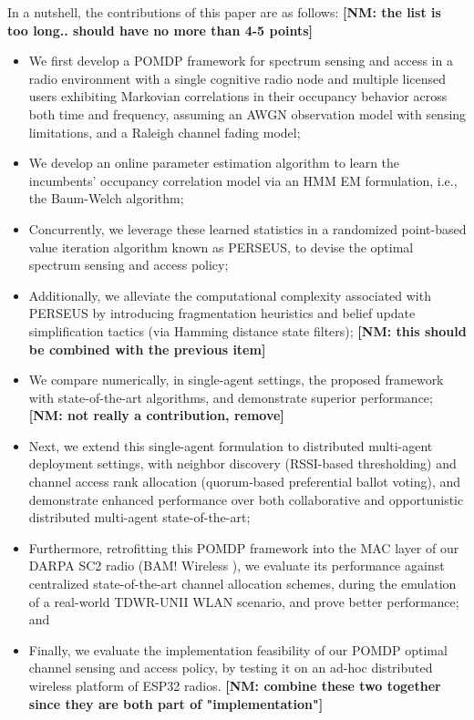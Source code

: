 \documentclass[12pt, draftcls, onecolumn]{IEEEtran}
\newcommand{\nm}[1]{{\color{blue}\bf{[NM: #1]}}}
\begin{document}
 In a nutshell, the contributions of this paper are as follows:
\nm{the list is too long.. should have no more than 4-5 points}
\begin{itemize}
    \item We first develop a POMDP framework for spectrum sensing and access in a radio environment with a single cognitive radio node and multiple licensed users exhibiting Markovian correlations in their occupancy behavior across both time and frequency, assuming an AWGN observation model with sensing limitations, and a Raleigh channel fading model;
    \item We develop an online parameter estimation algorithm to learn the incumbents' occupancy correlation model via an HMM EM formulation, i.e., the Baum-Welch algorithm;
    \item Concurrently, we leverage these learned statistics in a randomized point-based value iteration algorithm known as PERSEUS, to devise the optimal spectrum sensing and access policy;
    \item Additionally, we alleviate the computational complexity associated with PERSEUS by introducing fragmentation heuristics and belief update simplification tactics (via Hamming distance state filters);
    \nm{this should be combined with the previous item}
    \item We compare numerically, in single-agent settings, the proposed framework with state-of-the-art algorithms, and demonstrate superior performance;
    \nm{not really a contribution, remove}
    \item Next, we extend this single-agent formulation to distributed multi-agent deployment settings, with neighbor discovery (RSSI-based thresholding) and channel access rank allocation (quorum-based preferential ballot voting), and demonstrate enhanced performance over both collaborative and opportunistic distributed multi-agent state-of-the-art;
    \item Furthermore, retrofitting this POMDP framework into the MAC layer of our DARPA SC2 radio (BAM! Wireless \cite{BAM}), we evaluate its performance against centralized state-of-the-art channel allocation schemes, during the emulation of a real-world TDWR-UNII WLAN scenario, and prove better performance; and
    \item Finally, we evaluate the implementation feasibility of our POMDP optimal channel sensing and access policy, by testing it on an ad-hoc distributed wireless platform of ESP32 radios.
    \nm{combine these two together since they are both part of "implementation"}
\end{itemize}
\end{document}

